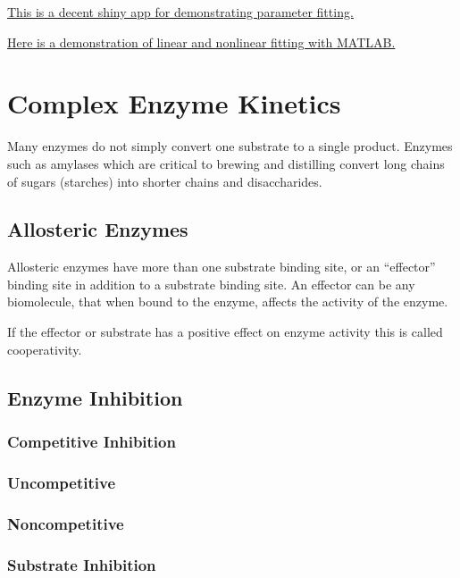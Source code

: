 \documentclass[
]{article}
\begin{document}
\href{https://drclongstaff.shinyapps.io/MichaelisMentenCL/}{This is a decent shiny app for demonstrating parameter fitting.}

\href{https://sites.duke.edu/bossbackup/files/2013/02/nonlime.pdf}{Here is a demonstration of linear and nonlinear fitting with MATLAB.}

\hypertarget{complex-enzyme-kinetics}{%
\section{Complex Enzyme Kinetics}\label{complex-enzyme-kinetics}}

Many enzymes do not simply convert one substrate to a single product. Enzymes such as amylases which are critical to brewing and distilling convert long chains of sugars (starches) into shorter chains and disaccharides.

\hypertarget{allosteric-enzymes}{%
\subsection{Allosteric Enzymes}\label{allosteric-enzymes}}

Allosteric enzymes have more than one substrate binding site, or an ``effector'' binding site in addition to a substrate binding site. An effector can be any biomolecule, that when bound to the enzyme, affects the activity of the enzyme.

If the effector or substrate has a positive effect on enzyme activity this is called cooperativity.

\hypertarget{enzyme-inhibition}{%
\subsection{Enzyme Inhibition}\label{enzyme-inhibition}}

\hypertarget{competitive-inhibition}{%
\subsubsection{Competitive Inhibition}\label{competitive-inhibition}}

\hypertarget{uncompetitive}{%
\subsubsection{Uncompetitive}\label{uncompetitive}}

\hypertarget{noncompetitive}{%
\subsubsection{Noncompetitive}\label{noncompetitive}}

\hypertarget{substrate-inhibition}{%
\subsubsection{Substrate Inhibition}\label{substrate-inhibition}}
\end{document}
